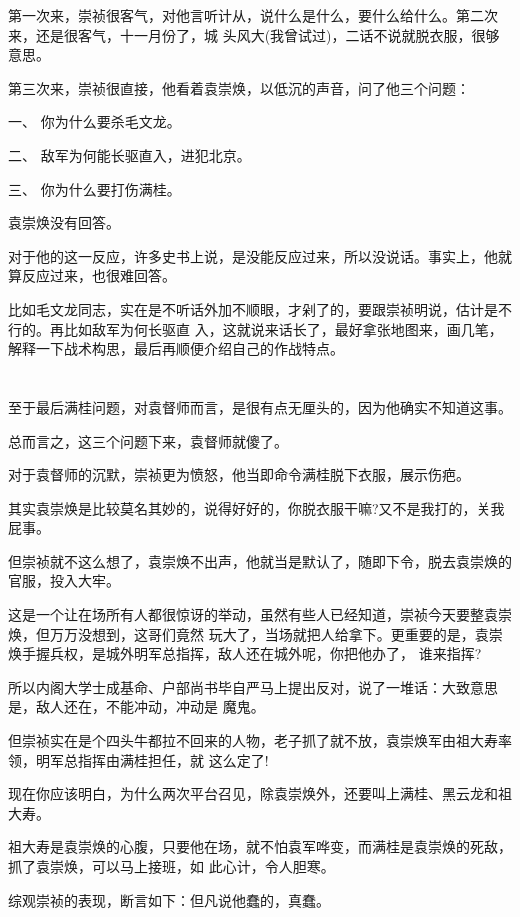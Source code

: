 \documentclass[11pt,a4paper,onecolumn]{article}
\begin{document}
第一次来，崇祯很客气，对他言听计从，说什么是什么，要什么给什么。第二次来，还是很客气，十一月份了，城
头风大(我曾试过)，二话不说就脱衣服，很够意思。

第三次来，崇祯很直接，他看着袁崇焕，以低沉的声音，问了他三个问题：

一、 你为什么要杀毛文龙。

二、 敌军为何能长驱直入，进犯北京。

三、 你为什么要打伤满桂。

袁崇焕没有回答。

对于他的这一反应，许多史书上说，是没能反应过来，所以没说话。事实上，他就算反应过来，也很难回答。

比如毛文龙同志，实在是不听话外加不顺眼，才剁了的，要跟崇祯明说，估计是不行的。再比如敌军为何长驱直
入，这就说来话长了，最好拿张地图来，画几笔，解释一下战术构思，最后再顺便介绍自己的作战特点。

\section[\thesection]{}

至于最后满桂问题，对袁督师而言，是很有点无厘头的，因为他确实不知道这事。

总而言之，这三个问题下来，袁督师就傻了。

对于袁督师的沉默，崇祯更为愤怒，他当即命令满桂脱下衣服，展示伤疤。

其实袁崇焕是比较莫名其妙的，说得好好的，你脱衣服干嘛?又不是我打的，关我屁事。

但崇祯就不这么想了，袁崇焕不出声，他就当是默认了，随即下令，脱去袁崇焕的官服，投入大牢。

这是一个让在场所有人都很惊讶的举动，虽然有些人已经知道，崇祯今天要整袁崇焕，但万万没想到，这哥们竟然
玩大了，当场就把人给拿下。更重要的是，袁崇焕手握兵权，是城外明军总指挥，敌人还在城外呢，你把他办了，
谁来指挥?

所以内阁大学士成基命、户部尚书毕自严马上提出反对，说了一堆话：大致意思是，敌人还在，不能冲动，冲动是
魔鬼。

但崇祯实在是个四头牛都拉不回来的人物，老子抓了就不放，袁崇焕军由祖大寿率领，明军总指挥由满桂担任，就
这么定了!

现在你应该明白，为什么两次平台召见，除袁崇焕外，还要叫上满桂、黑云龙和祖大寿。

祖大寿是袁崇焕的心腹，只要他在场，就不怕袁军哗变，而满桂是袁崇焕的死敌，抓了袁崇焕，可以马上接班，如
此心计，令人胆寒。

综观崇祯的表现，断言如下：但凡说他蠢的，真蠢。
\end{document}
